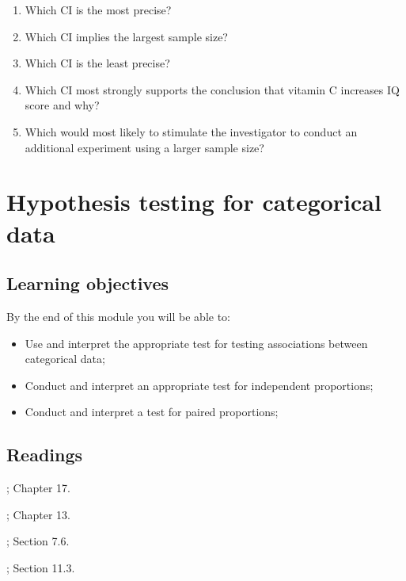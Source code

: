 \documentclass[
]{memoir}
\providecommand{\tightlist}{%
  \setlength{\itemsep}{0pt}\setlength{\parskip}{0pt}}
\begin{document}
\begin{enumerate}
\def\labelenumi{\alph{enumi})}
\tightlist
\item
  Which CI is the most precise?
\item
  Which CI implies the largest sample size?
\item
  Which CI is the least precise?
\item
  Which CI most strongly supports the conclusion that vitamin C increases IQ score and why?
\item
  Which would most likely to stimulate the investigator to conduct an additional experiment using a larger sample size?
\end{enumerate}

\hypertarget{hypothesis-testing-for-categorical-data}{%
\chapter{Hypothesis testing for categorical data}\label{hypothesis-testing-for-categorical-data}}

\hypertarget{learning-objectives-6}{%
\section*{Learning objectives}\label{learning-objectives-6}}

By the end of this module you will be able to:

\begin{itemize}
\tightlist
\item
  Use and interpret the appropriate test for testing associations between categorical data;
\item
  Conduct and interpret an appropriate test for independent proportions;
\item
  Conduct and interpret a test for paired proportions;
\end{itemize}

\hypertarget{readings-6}{%
\section*{Readings}\label{readings-6}}

\citet{kirkwood_sterne01}; Chapter 17.

\citet{bland15}; Chapter 13.

\citet{acock10}; Section 7.6.

\citet{juul_frydenberg14}; Section 11.3.
\end{document}
